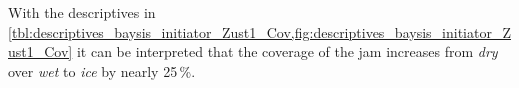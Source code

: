 With the descriptives in \cref{tbl:descriptives_baysis_initiator_Zust1_Cov,fig:descriptives_baysis_initiator_Zust1_Cov} it can be interpreted that the coverage of the jam increases from \textit{dry} over \textit{wet} to \textit{ice} by nearly 25\,\%.


